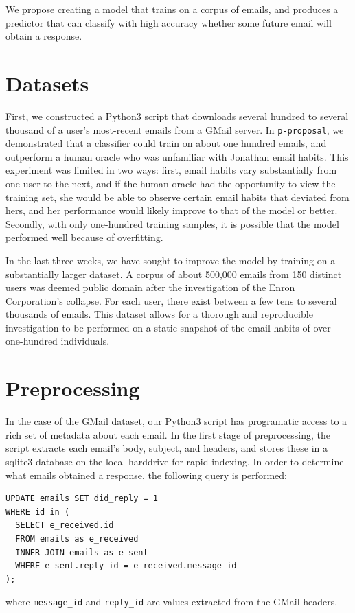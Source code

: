 \documentclass[10pt]{article}
\begin{document}
We propose creating a model that trains on a corpus of emails, and produces a predictor that can classify with high accuracy whether some future email will obtain a response.


\section*{Datasets}

First, we constructed a Python3 script that downloads several hundred to several thousand of a user's most-recent emails from a GMail server. In \texttt{p-proposal}, we demonstrated that a classifier could train on about one hundred emails, and outperform a human oracle who was unfamiliar with Jonathan email habits. This experiment was limited in two ways: first, email habits vary substantially from one user to the next, and if the human oracle had the opportunity to view the training set, she would be able to observe certain email habits that deviated from hers, and her performance would likely improve to that of the model or better. Secondly, with only one-hundred training samples, it is possible that the model performed well because of overfitting.

In the last three weeks, we have sought to improve the model by training on a substantially larger dataset. A corpus of about 500,000 emails from 150 distinct users was deemed public domain after the investigation of the Enron Corporation's collapse\cite{enroncorpus}. For each user, there exist between a few tens to several thousands of emails. This dataset allows for a thorough and reproducible investigation to be performed on a static snapshot of the email habits of over one-hundred individuals.

\section*{Preprocessing}

In the case of the GMail dataset, our Python3 script has programatic access to a rich set of metadata about each email. In the first stage of preprocessing, the script extracts each email's body, subject, and headers, and stores these in a sqlite3 database on the local harddrive for rapid indexing. In order to determine what emails obtained a response, the following query is performed:
\begin{verbatim}
UPDATE emails SET did_reply = 1
WHERE id in (
  SELECT e_received.id
  FROM emails as e_received
  INNER JOIN emails as e_sent
  WHERE e_sent.reply_id = e_received.message_id
);
\end{verbatim}
%
where \texttt{message\_id} and \texttt{reply\_id} are values extracted from the GMail headers.
\end{document}
